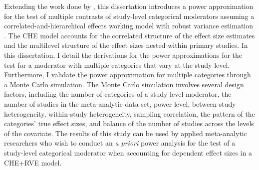 Extending the work done by \textcite{vembye2023}, this dissertation introduces a power approximation for the test of multiple contrasts of study-level categorical moderators assuming a correlated-and-hierarchical effects working model with robust variance estimation \autocite[e.\,g. CHE+RVE;][]{pustejovsky2022, hedges2010}. The CHE model accounts for the correlated structure of the effect size estimates and the multilevel structure of the effect sizes nested within primary studies. In this dissertation, I detail the derivations for the power approximations for the test for a moderator with multiple categories that vary at the study level. Furthermore, I validate the power approximation for multiple categories through a Monte Carlo simulation. The Monte Carlo simulation involves several design factors, including the number of categories of a study-level moderator, the number of studies in the meta-analytic data set, power level, between-study heterogeneity, within-study heterogeneity, sampling correlation, the pattern of the categories' true effect sizes, and balance of the number of studies across the levels of the covariate. The results of this study can be used by applied meta-analytic researchers who wish to conduct an \textit{a priori} power analysis for the test of a study-level categorical moderator when accounting for dependent effect sizes in a CHE+RVE model.  

